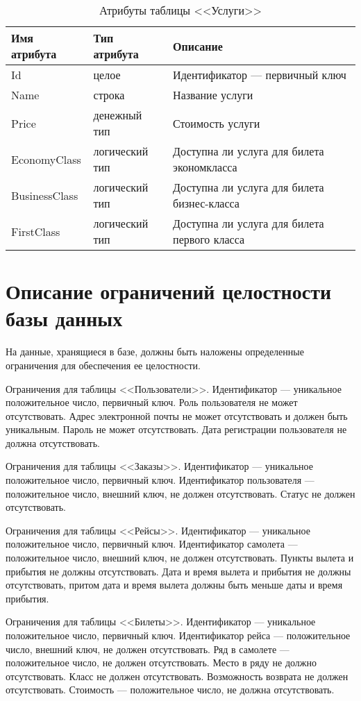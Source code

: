 \documentclass{bmstu}
\begin{document}
\begin{table}[H]
\caption{Атрибуты таблицы <<Услуги>>}
\label{tabular:services}
\begin{tabular}{|>{\raggedleft}p{4cm}|>{\raggedleft}p{3cm}|>{\raggedleft}p{8cm}|}
\hline
\textbf{Имя атрибута} & \textbf{Тип атрибута} & \textbf{Описание}
\tabularnewline
\hline
Id & целое & Идентификатор --- первичный ключ
\tabularnewline
\hline
Name & строка & Название услуги
\tabularnewline
\hline
Price & денежный тип & Стоимость услуги
\tabularnewline
\hline
EconomyClass & логический тип & Доступна ли услуга для билета экономкласса
\tabularnewline
\hline
BusinessClass & логический тип & Доступна ли услуга для билета бизнес-класса
\tabularnewline
\hline
FirstClass & логический тип & Доступна ли услуга для билета первого класса
\tabularnewline
\hline
\end{tabular}
\end{table}

\section{Описание ограничений целостности базы данных}

На данные, хранящиеся в базе, должны быть наложены определенные ограничения для обеспечения ее целостности.

Ограничения для таблицы <<Пользователи>>. 
Идентификатор --- уникальное положительное число, первичный ключ. 
Роль пользователя не может отсутствовать.
Адрес электронной почты не может отсутствовать и должен быть уникальным. 
Пароль не может отсутствовать. 
Дата регистрации пользователя не должна отсутствовать.

Ограничения для таблицы <<Заказы>>. 
Идентификатор --- уникальное положительное число, первичный ключ. 
Идентификатор пользователя --- положительное число, внешний ключ, не должен отсутствовать. 
Статус не должен отсутствовать.

Ограничения для таблицы <<Рейсы>>. 
Идентификатор --- уникальное положительное число, первичный ключ. 
Идентификатор самолета --- положительное число, внешний ключ, не должен отсутствовать. 
Пункты вылета и прибытия не должны отсутствовать. 
Дата и время вылета и прибытия не должны отсутствовать, притом дата и время вылета должны быть меньше даты и время прибытия. 

Ограничения для таблицы <<Билеты>>. 
Идентификатор --- уникальное положительное число, первичный ключ. 
Идентификатор рейса --- положительное число, внешний ключ, не должен отсутствовать. 
Ряд в самолете --- положительное число, не должен отсутствовать. 
Место в ряду не должно отсутствовать. 
Класс не должен отсутствовать. 
Возможность возврата не должен отсутствовать. 
Стоимость --- положительное число, не должна отсутствовать.
\end{document}
